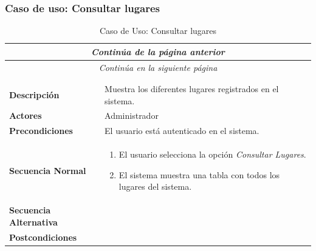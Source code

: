\newpage
\subsubsection*{Caso de uso: Consultar lugares }
\begin{longtable}{| p{4cm} | p{10cm} |}
\endfirsthead
\multicolumn{2}{c}{\textit{Continúa de la página anterior}}\\[12pt]
\hline
\endhead
\hline
\multicolumn{2}{c}{\textit{Continúa en la siguiente página}} \\
\endfoot
\hline
\caption{Caso de Uso: Consultar lugares}\label{fig:1}\\
\endlastfoot


\hline
\multicolumn{2}{|c|}{\textbf{CU$<$34$>$ - Consultar Lugares}} \\

\hline
\textbf{Descripción} &
Muestra los diferentes lugares registrados en el sistema.\\

\hline
\textbf{Actores} &
Administrador\\

\hline
\textbf{Precondiciones} &
El usuario está autenticado en el sistema.\\

\hline
\textbf{Secuencia Normal} &\mbox{}\par\vspace{-\baselineskip}
\begin{enumerate}[leftmargin=0.7cm, topsep=0.1cm]
\item El usuario selecciona la opción \textit{Consultar Lugares}.
\item El sistema muestra una tabla con todos los lugares del sistema.
\end{enumerate}


\\
\hline
\textbf{Secuencia Alternativa} &\mbox{}\par\vspace{-\baselineskip}
\\

\hline
\textbf{Postcondiciones} & \\
\hline
\end{longtable}



\newpage
